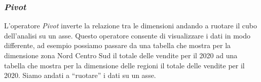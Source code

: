     \subsubsection{\textit{Pivot}}
        L'operatore \textit{Pivot} inverte la relazione tra le dimensioni andando a ruotare il cubo dell'analisi su un asse. Questo operatore consente di visualizzare i dati in modo differente, ad esempio possiamo passare da una tabella che mostra per la dimensione zona Nord Centro Sud il totale delle vendite per il 2020 ad una tabella che mostra per la dimensione delle regioni il totale delle vendite per il 2020. Siamo andati a ``ruotare'' i dati su un asse.
    